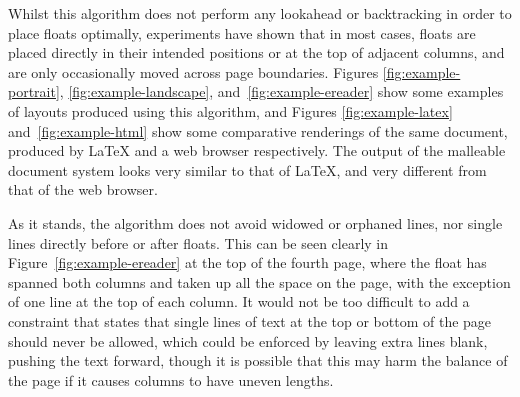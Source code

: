 Whilst this algorithm does not perform any lookahead or backtracking in order to place floats optimally, experiments have shown that in most cases, floats are placed directly in their intended positions or at the top of adjacent columns, and are only occasionally moved across page boundaries. Figures \ref{fig:example-portrait}, \ref{fig:example-landscape}, and~\ref{fig:example-ereader} show some examples of layouts produced using this algorithm, and Figures \ref{fig:example-latex} and~\ref{fig:example-html} show some comparative renderings of the same document, produced by \LaTeX{} and a web browser respectively. The output of the malleable document system looks very similar to that of \LaTeX, and very different from that of the web browser.

As it stands, the algorithm does not avoid widowed or orphaned lines, nor single lines directly before or after floats. This can be seen clearly in Figure~\ref{fig:example-ereader} at the top of the fourth page, where the float has spanned both columns and taken up all the space on the page, with the exception of one line at the top of each column. It would not be too difficult to add a constraint that states that single lines of text at the top or bottom of the page should never be allowed, which could be enforced by leaving extra lines blank, pushing the text forward, though it is possible that this may harm the balance of the page if it causes columns to have uneven lengths.

